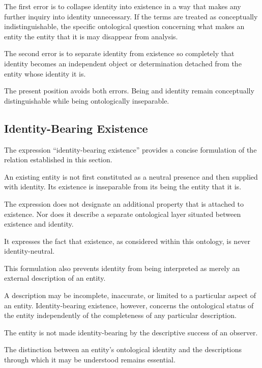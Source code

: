 The first error is to collapse identity into
existence in a way that makes any further inquiry
into identity unnecessary. If the terms are treated
as conceptually indistinguishable, the specific
ontological question concerning what makes an entity
the entity that it is may disappear from analysis.

The second error is to separate identity from
existence so completely that identity becomes an
independent object or determination detached from
the entity whose identity it is.

The present position avoids both errors. Being
and identity remain conceptually distinguishable
while being ontologically inseparable.



\subsection{Identity-Bearing Existence}
\label{subsec:identity-bearing-existence}

The expression ``identity-bearing existence''
provides a concise formulation of the relation
established in this section.

An existing entity is not first constituted as
a neutral presence and then supplied with identity.
Its existence is inseparable from its being the
entity that it is.

The expression does not designate an additional
property that is attached to existence. Nor does
it describe a separate ontological layer situated
between existence and identity.

It expresses the fact that existence, as considered
within this ontology, is never identity-neutral.

This formulation also prevents identity from
being interpreted as merely an external description
of an entity.

A description may be incomplete, inaccurate, or
limited to a particular aspect of an entity.
Identity-bearing existence, however, concerns
the ontological status of the entity independently
of the completeness of any particular description.

The entity is not made identity-bearing by the
descriptive success of an observer.

The distinction between an entity's ontological
identity and the descriptions through which it
may be understood remains essential.

